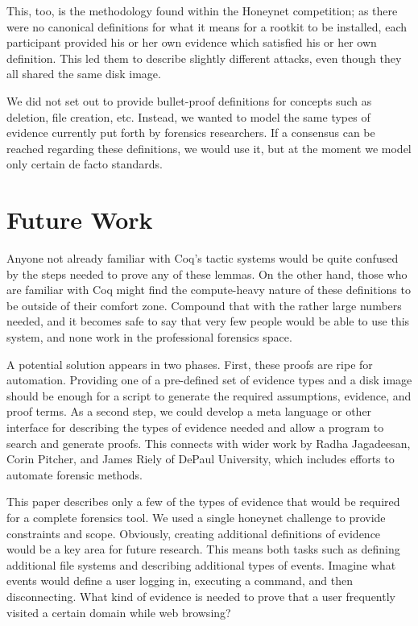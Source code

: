 \documentclass[nocopyrightspace]{sigplanconf}
\begin{document}
This, too, is the methodology found within the Honeynet competition; as there
were no canonical definitions for what it means for a rootkit to be installed,
each participant provided his or her own evidence which satisfied his or her
own definition. This led them to describe slightly different attacks, even
though they all shared the same disk image.

We did not set out to provide bullet-proof definitions for concepts such as
deletion, file creation, etc. Instead, we wanted to model the same types of
evidence currently put forth by forensics researchers. If a consensus can be
reached regarding these definitions, we would use it, but at the moment we
model only certain de facto standards.

\section{Future Work}
Anyone not already familiar with Coq's tactic systems would be quite confused
by the steps needed to prove any of these lemmas. On the other hand, those who
are familiar with Coq might find the compute-heavy nature of these definitions
to be outside of their comfort zone. Compound that with the rather large
numbers needed, and it becomes safe to say that very few people would be able
to use this system, and none work in the professional forensics space.

A potential solution appears in two phases. First, these proofs are ripe for
automation. Providing one of a pre-defined set of evidence types and a disk
image should be enough for a script to generate the required assumptions,
evidence, and proof terms. As a second step, we could develop a meta language
or other interface for describing the types of evidence needed and allow a
program to search and generate proofs. This connects with wider work by Radha
Jagadeesan, Corin Pitcher, and James Riely of DePaul University, which
includes efforts to automate forensic methods.

This paper describes only a few of the types of evidence that would be
required for a complete forensics tool. We used a single honeynet challenge to
provide constraints and scope. Obviously, creating additional definitions of
evidence would be a key area for future research. This means both tasks such
as defining additional file systems and describing additional types of events.
Imagine what events would define a user logging in, executing a command, and
then disconnecting. What kind of evidence is needed to prove that a user
frequently visited a certain domain while web browsing?
\end{document}
